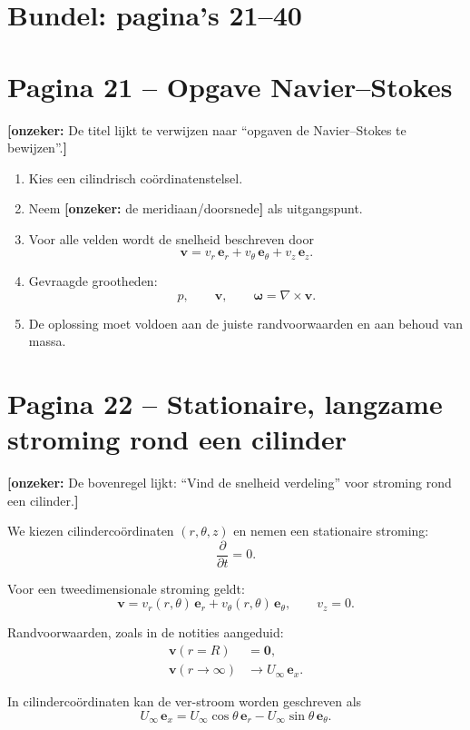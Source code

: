 \documentclass[11pt,a4paper]{article}
\newcommand{\onzeker}[1]{\ifmmode\text{\color{red!70!black}\bfseries[onzeker]}\else\textcolor{red!70!black}{\textbf{[onzeker:} #1\textbf{]}}\fi}
\newcommand{\p}{\partial}
\newcommand{\curl}{\nabla\times}
\begin{document}
\clearpage
\section*{Bundel: pagina's 21--40}
\section*{Pagina 21 -- Opgave Navier--Stokes}

\onzeker{De titel lijkt te verwijzen naar ``opgaven de Navier--Stokes te bewijzen''.}

\begin{enumerate}[label=\alph*)]
    \item Kies een cilindrisch coördinatenstelsel.
    \item Neem \onzeker{de meridiaan/doorsnede} als uitgangspunt.
    \item Voor alle velden wordt de snelheid beschreven door
    \[
        \mathbf{v}
        =
        v_r\,\mathbf{e}_r
        +
        v_\theta\,\mathbf{e}_\theta
        +
        v_z\,\mathbf{e}_z .
    \]
    \item Gevraagde grootheden:
    \[
        p,\qquad \mathbf{v},\qquad \bm{\omega}=\curl\mathbf{v}.
    \]
    \item De oplossing moet voldoen aan de juiste randvoorwaarden en aan behoud van massa.
\end{enumerate}

\section*{Pagina 22 -- Stationaire, langzame stroming rond een cilinder}

\onzeker{De bovenregel lijkt: ``Vind de snelheid verdeling'' voor stroming rond een cilinder.}

We kiezen cilindercoördinaten $(r,\theta,z)$ en nemen een stationaire stroming:
\[
    \frac{\p}{\p t}=0 .
\]

Voor een tweedimensionale stroming geldt:
\[
    \mathbf{v}=v_r(r,\theta)\,\mathbf{e}_r
    +
    v_\theta(r,\theta)\,\mathbf{e}_\theta,
    \qquad
    v_z=0 .
\]

Randvoorwaarden, zoals in de notities aangeduid:
\begin{align*}
    \mathbf{v}(r=R) &= \mathbf{0},\\
    \mathbf{v}(r\to\infty) &\to U_\infty\,\mathbf{e}_x .
\end{align*}

In cilindercoördinaten kan de ver-stroom worden geschreven als
\[
    U_\infty\,\mathbf{e}_x
    =
    U_\infty\cos\theta\,\mathbf{e}_r
    -
    U_\infty\sin\theta\,\mathbf{e}_\theta .
\]
\end{document}
